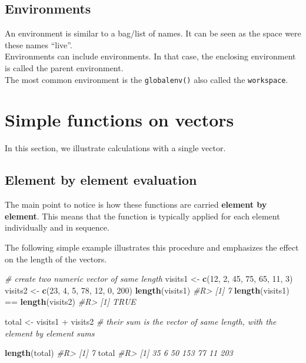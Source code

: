 \documentclass[]{book}
\newenvironment{Shaded}{}{}
\newcommand{\CommentTok}[1]{\textcolor[rgb]{0.38,0.63,0.69}{\textit{#1}}}
\newcommand{\DecValTok}[1]{\textcolor[rgb]{0.25,0.63,0.44}{#1}}
\newcommand{\KeywordTok}[1]{\textcolor[rgb]{0.00,0.44,0.13}{\textbf{#1}}}
\newcommand{\NormalTok}[1]{#1}
\newcommand{\OperatorTok}[1]{\textcolor[rgb]{0.40,0.40,0.40}{#1}}
\newcommand{\StringTok}[1]{\textcolor[rgb]{0.25,0.44,0.63}{#1}}
\theoremstyle{definition}
\theoremstyle{definition}
\theoremstyle{definition}
\theoremstyle{remark}
\begin{document}
\hypertarget{environments}{%
\section{Environments}\label{environments}}

An environment is similar to a bag/list of names. It can be seen as the
space were these names ``live''.\\
Environments can include environments. In that case, the enclosing
environment is called the parent environment.\\
The most common environment is the \texttt{globalenv()} also called the
\texttt{workspace}.

\hypertarget{simple-functions-on-vectors}{%
\chapter{Simple functions on
vectors}\label{simple-functions-on-vectors}}

In this section, we illustrate calculations with a single vector.

\hypertarget{element-by-element-evaluation}{%
\section{Element by element
evaluation}\label{element-by-element-evaluation}}

The main point to notice is how these functions are carried
\textbf{element by element}. This means that the function is typically
applied for each element individually and in sequence.

The following simple example illustrates this procedure and emphasizes
the effect on the length of the vectors.

\begin{Shaded}
\begin{Highlighting}[]
\CommentTok{# create two numeric vector of same length}
\NormalTok{visits1 <-}\StringTok{  }\KeywordTok{c}\NormalTok{(}\DecValTok{12}\NormalTok{, }\DecValTok{2}\NormalTok{, }\DecValTok{45}\NormalTok{, }\DecValTok{75}\NormalTok{, }\DecValTok{65}\NormalTok{, }\DecValTok{11}\NormalTok{, }\DecValTok{3}\NormalTok{)}
\NormalTok{visits2 <-}\StringTok{ }\KeywordTok{c}\NormalTok{(}\DecValTok{23}\NormalTok{, }\DecValTok{4}\NormalTok{, }\DecValTok{5}\NormalTok{, }\DecValTok{78}\NormalTok{, }\DecValTok{12}\NormalTok{, }\DecValTok{0}\NormalTok{, }\DecValTok{200}\NormalTok{)}
\KeywordTok{length}\NormalTok{(visits1)}
\CommentTok{#R> [1] 7}
\KeywordTok{length}\NormalTok{(visits1) }\OperatorTok{==}\StringTok{ }\KeywordTok{length}\NormalTok{(visits2)}
\CommentTok{#R> [1] TRUE}

\NormalTok{total <-}\StringTok{ }\NormalTok{visits1 }\OperatorTok{+}\StringTok{ }\NormalTok{visits2}
\CommentTok{# their sum is the vector of same length, with the element by element sums}

\KeywordTok{length}\NormalTok{(total)}
\CommentTok{#R> [1] 7}
\NormalTok{total}
\CommentTok{#R> [1]  35   6  50 153  77  11 203}
\end{Highlighting}
\end{Shaded}
\end{document}
